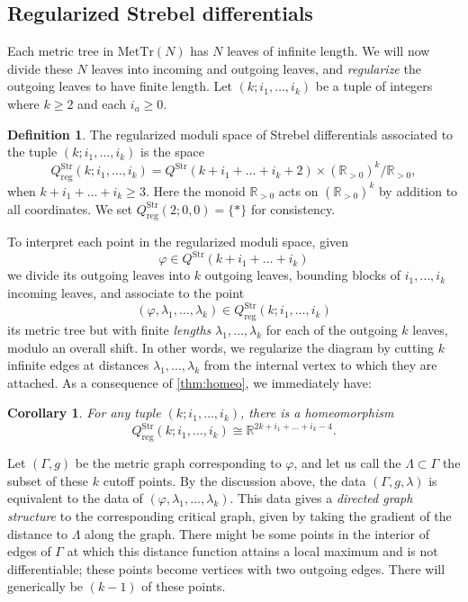 \documentclass[11pt,a4paper]{amsart}
\newcommand{\RR}{\ensuremath{\mathbb{R}}}
\newtheorem{corollary}[theorem]{Corollary}
\theoremstyle{definition}
\newtheorem{definition}{Definition}
\begin{document}
\subsection{Regularized Strebel differentials}
Each metric tree in $\mathrm{MetTr}(N)$ has $N$ leaves of infinite length. We will now divide these $N$ leaves into incoming and outgoing leaves, and \emph{regularize} the outgoing leaves to have finite length. Let $(k;i_1,\dots,i_k)$ be a tuple of integers where $k \ge 2$ and each $i_a \ge 0$.
\begin{definition}
    The regularized moduli space of Strebel differentials associated to the tuple $(k;i_1,\dots,i_k)$ is the space 
    \[ Q^\mathrm{Str}_\mathrm{reg}(k;i_1,\dots,i_k) = Q^\mathrm{Str}(k + i_1 + \dots + i_k + 2) \times (\mathbb{R}_{>0})^k/\mathbb{R}_{>0}, \]
    when $k+ i_1 + \dots + i_k \ge 3$. Here the monoid $\mathbb{R}_{>0}$ acts on $(\mathbb{R}_{>0})^k$ by addition to all coordinates. We set $Q^\mathrm{Str}_\mathrm{reg}(2;0,0) = \{*\}$ for consistency.
\end{definition}
\noindent To interpret each point in the regularized moduli space, given 
\[ \varphi \in  Q^\mathrm{Str}(k + i_1 + \dots + i_k)\]
we divide its outgoing leaves into $k$ outgoing leaves, bounding blocks of $i_1,\dots,i_k$ incoming leaves, and associate to the point
\[ (\varphi,\lambda_1,\dots,\lambda_k) \in Q^\mathrm{Str}_\mathrm{reg}(k;i_1,\dots,i_k) \]
its metric tree but with finite \emph{lengths} $\lambda_1,\dots,\lambda_k$ for each of the outgoing $k$ leaves, modulo an overall shift. In other words, we regularize the diagram by cutting $k$ infinite edges at distances $\lambda_1,\dots,\lambda_k$ from the internal vertex to which they are attached. As a consequence of \cref{thm:homeo}, we immediately have:
\begin{corollary}
    For any tuple $(k;i_1,\dots,i_k)$, there is a homeomorphism
    \[ Q^\mathrm{Str}_\mathrm{reg}(k;i_1,\dots,i_k) \cong \RR^{2k+i_1+ \dots + i_k -4}. \]
\end{corollary}

\noindent Let $(\Gamma,g)$ be the metric graph corresponding to $\varphi$, and let us call the $\Lambda \subset \Gamma$ the subset of these $k$ cutoff points. By the discussion above, the data $(\Gamma,g,\lambda)$ is equivalent to the data of $(\varphi,\lambda_1,\dots,\lambda_k)$. This data gives a \emph{directed graph structure} to the corresponding critical graph, given by taking the gradient of the distance to $\Lambda$ along the graph. There might be some points in the interior of edges of $\Gamma$ at which this distance function attains a local maximum and is not differentiable; these points become vertices with two outgoing edges. There will generically be $(k-1)$ of these points.
\end{document}
